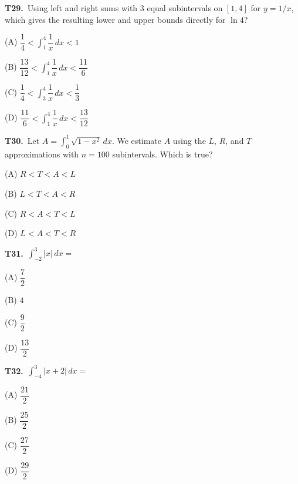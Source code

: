 \documentclass[11pt]{article}
\begin{document}
\bigskip\noindent\textbf{T29.}\ Using left and right sums with 3 equal subintervals on $[1,4]$ for $y=1/x$, which gives the resulting lower and upper bounds directly for $\ln4$?
\begin{list}{}{\setlength{\leftmargin}{3em}\setlength{\labelwidth}{2.5em}\setlength{\itemsep}{0pt}\setlength{\topsep}{2pt}}
\item[(A)] $\dfrac{1}{4} < \displaystyle\int_{1}^{4} \dfrac{1}{x}\,dx < 1$
\item[(B)] $\dfrac{13}{12} < \displaystyle\int_{1}^{4} \dfrac{1}{x}\,dx < \dfrac{11}{6}$
\item[(C)] $\dfrac{1}{4} < \displaystyle\int_{3}^{4} \dfrac{1}{x}\,dx < \dfrac{1}{3}$
\item[(D)] $\dfrac{11}{6} < \displaystyle\int_{1}^{4} \dfrac{1}{x}\,dx < \dfrac{13}{12}$
\end{list}

\bigskip\noindent\textbf{T30.}\ Let $A = \displaystyle\int_{0}^{1} \sqrt{1-x^2}\,dx$. We estimate $A$ using the $L$, $R$, and $T$ approximations with $n=100$ subintervals. Which is true?
\begin{list}{}{\setlength{\leftmargin}{3em}\setlength{\labelwidth}{2.5em}\setlength{\itemsep}{0pt}\setlength{\topsep}{2pt}}
\item[(A)] $R < T < A < L$
\item[(B)] $L < T < A < R$
\item[(C)] $R < A < T < L$
\item[(D)] $L < A < T < R$
\end{list}

\bigskip\noindent\textbf{T31.}\ $\displaystyle\int_{-2}^{3} |x|\,dx =$
\begin{list}{}{\setlength{\leftmargin}{3em}\setlength{\labelwidth}{2.5em}\setlength{\itemsep}{0pt}\setlength{\topsep}{2pt}}
\item[(A)] $\dfrac{7}{2}$
\item[(B)] $4$
\item[(C)] $\dfrac{9}{2}$
\item[(D)] $\dfrac{13}{2}$
\end{list}

\bigskip\noindent\textbf{T32.}\ $\displaystyle\int_{-4}^{3} |x+2|\,dx =$
\begin{list}{}{\setlength{\leftmargin}{3em}\setlength{\labelwidth}{2.5em}\setlength{\itemsep}{0pt}\setlength{\topsep}{2pt}}
\item[(A)] $\dfrac{21}{2}$
\item[(B)] $\dfrac{25}{2}$
\item[(C)] $\dfrac{27}{2}$
\item[(D)] $\dfrac{29}{2}$
\end{list}
\end{document}
